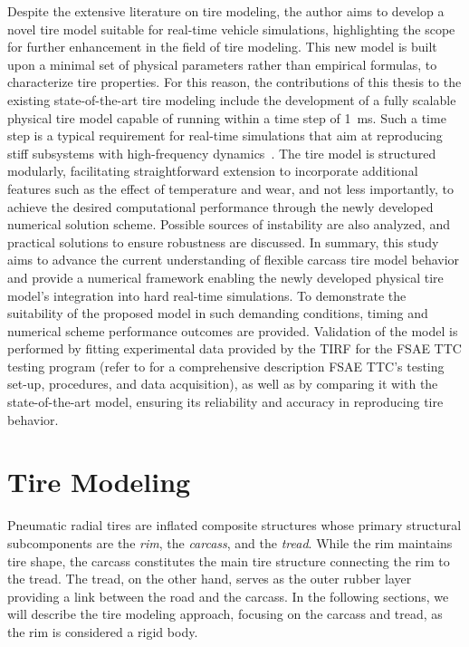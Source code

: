 Despite the extensive literature on tire modeling, the author aims to develop a novel tire model suitable for real-time vehicle simulations, highlighting the scope for further enhancement in the field of tire modeling. This new model is built upon a minimal set of physical parameters rather than empirical formulas, to characterize tire properties. For this reason, the contributions of this thesis to the existing state-of-the-art tire modeling include the development of a fully scalable physical tire model capable of running within a time step of \SI{1}{\milli\second}. Such a time step is a typical requirement for real-time simulations that aim at reproducing stiff subsystems with high-frequency dynamics~\cite{pacejka2012tire}. The tire model is structured modularly, facilitating straightforward extension to incorporate additional features such as the effect of temperature and wear, and not less importantly, to achieve the desired computational performance through the newly developed numerical solution scheme. Possible sources of instability are also analyzed, and practical solutions to ensure robustness are discussed. In summary, this study aims to advance the current understanding of flexible carcass tire model behavior and provide a numerical framework enabling the newly developed physical tire model's integration into hard real-time simulations. To demonstrate the suitability of the proposed model in such demanding conditions, timing and numerical scheme performance outcomes are provided. Validation of the model is performed by fitting experimental data provided by the \ac{TIRF} for the \ac{FSAE} \ac{TTC} testing program (refer to \citet{kasprzak2006formula} for a comprehensive description \ac{FSAE} \ac{TTC}'s testing set-up, procedures, and data acquisition), as well as by comparing it with the state-of-the-art \MagicFormulae{} model, ensuring its reliability and accuracy in reproducing tire behavior.


\section{Tire Modeling}
\label{app3:sec:tire_modeling}

Pneumatic radial tires are inflated composite structures whose primary structural subcomponents are the \emph{rim}, the \emph{carcass}, and the \emph{tread}. While the rim maintains tire shape, the carcass constitutes the main tire structure connecting the rim to the tread. The tread, on the other hand, serves as the outer rubber layer providing a link between the road and the carcass. In the following sections, we will describe the tire modeling approach, focusing on the carcass and tread, as the rim is considered a rigid body.

